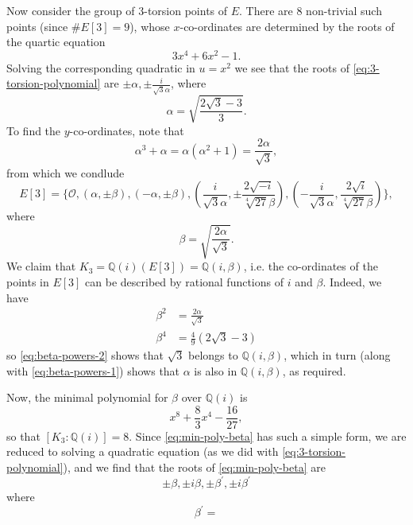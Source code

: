 Now consider the group of $3$-torsion points of $E$.  There are $8$ non-trivial such
points (since $ \# E[3] = 9$), whose $x$-co-ordinates are determined by the roots of
the quartic equation
\begin{equation}
  \label{eq:3-torsion-polynomial}
  3x^{4} + 6x^{2} - 1.
\end{equation}
Solving the corresponding quadratic in $u = x^{2}$ we see that the roots of
\eqref{eq:3-torsion-polynomial} are $\pm \alpha, \pm \frac{i}{\sqrt{3}\alpha}$, where
\begin{equation*}
  \alpha = \sqrt{ \frac{2\sqrt{3} - 3}{3} }.
\end{equation*}
To find the $y$-co-ordinates, note that
\begin{equation*}
  \alpha^{3} + \alpha = \alpha(\alpha^{2} + 1) = \frac{2\alpha}{\sqrt{3}},
\end{equation*}
from which we condlude
\begin{equation*}
  E[3] = \{ \mathcal{O}, (\alpha,\pm \beta), (-\alpha, \pm \beta),
  (\frac{i}{\sqrt{3}\alpha}, \pm \frac{2 \sqrt{-i}}{\sqrt[4]{27}\beta} ),
  (-\frac{i}{\sqrt{3}\alpha}, \frac{2 \sqrt{i}}{\sqrt[4]{27}\beta} )  \},
\end{equation*}
where
\begin{equation*}
  \beta = \sqrt{ \frac{2\alpha}{\sqrt{3}} }.
\end{equation*}
We claim that $K_{3} = \mathbb{Q}(i)(E[3]) = \mathbb{Q}(i,\beta)$, i.e. the
co-ordinates of the points in $E[3]$ can be described by rational functions of $i$
and $\beta$. Indeed, we have
\begin{align}
  \beta^{2}&= \frac{2\alpha}{\sqrt{3}} \label{eq:beta-powers-1}\\
  \beta^{4}&= \frac{4}{9}(2\sqrt{3} - 3) \label{eq:beta-powers-2}
\end{align}
so \eqref{eq:beta-powers-2} shows that $\sqrt{3}$ belongs to $\mathbb{Q}(i,\beta)$,
which in turn (along with \eqref{eq:beta-powers-1}) shows that $\alpha$ is also in
$\mathbb{Q}(i,\beta)$, as required.

Now, the minimal polynomial for $\beta$ over $\mathbb{Q}(i)$ is
\begin{equation}
  \label{eq:min-poly-beta}
  x^{8} + \frac{8}{3}x^{4} - \frac{16}{27},
\end{equation}
so that $[K_{3} : \mathbb{Q}(i) ] = 8$.  Since \eqref{eq:min-poly-beta} has such a
simple form, we are reduced to solving a quadratic equation (as we did with
\eqref{eq:3-torsion-polynomial}), and we find that the roots of
\eqref{eq:min-poly-beta} are
\begin{equation*}
  \pm \beta, \pm i \beta, \pm \beta^{\prime}, \pm i \beta^{\prime}
\end{equation*}
where
\begin{equation*}
  \beta^{\prime} = 
\end{equation*}


